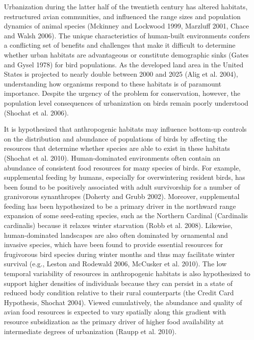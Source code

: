 \documentclass[12pt]{article}
\date{}
\begin{document}
\maketitle \vspace{-2cm}


\doublespace
{}\par
Urbanization during the latter half of the twentieth century has altered habitats, restructured avian communities, and influenced the range sizes and population dynamics of animal species (Mckinney and Lockwood 1999, Marzluff 2001, Chace and Walsh 2006). The unique characteristics of human-built environments confers a conflicting set of benefits and challenges that make it difficult to determine whether urban habitats are advantageous or constitute demographic sinks (Gates and Gysel 1978) for bird populations. As the developed land area in the United States is projected to nearly double between 2000 and 2025 (Alig et al. 2004), understanding how organisms respond to these habitats is of paramount importance. Despite the urgency of the problem for conservation, however, the population level consequences of urbanization on birds remain poorly understood (Shochat et al. 2006). \par

It is hypothesized that anthropogenic habitats may influence bottom-up controls on the distribution and abundance of populations of birds by affecting the resources that determine whether species are able to exist in these habitats (Shochat et al. 2010). Human-dominated environments often contain an abundance of consistent food resources for many species of birds. For example, supplemental feeding by humans, especially for overwintering resident birds, has been found to be positively associated with adult survivorship for a number of granivorous synanthropes (Doherty and Grubb 2002). Moreover, supplemental feeding has been hypothesized to be a primary driver in the northward range expansion of some seed-eating species, such as the Northern Cardinal (Cardinalis cardinalis) because it relaxes winter starvation (Robb et al. 2008). Likewise, human-dominated landscapes are also often dominated by ornamental and invasive species, which have been found to provide essential resources for frugivorous bird species during winter months and thus may facilitate winter survival (e.g., Leston and Rodewald 2006, McCusker et al. 2010). The low temporal variability of resources in anthropogenic habitats is also hypothesized to support higher densities of individuals because they can persist in a state of reduced body condition relative to their rural counterparts (the Credit Card Hypothesis, Shochat 2004). Viewed cumulatively, the abundance and quality of avian food resources is expected to vary spatially along this gradient with resource subsidization as the primary driver of higher food availability at intermediate degrees of urbanization (Raupp et al. 2010).\par
\end{document}
